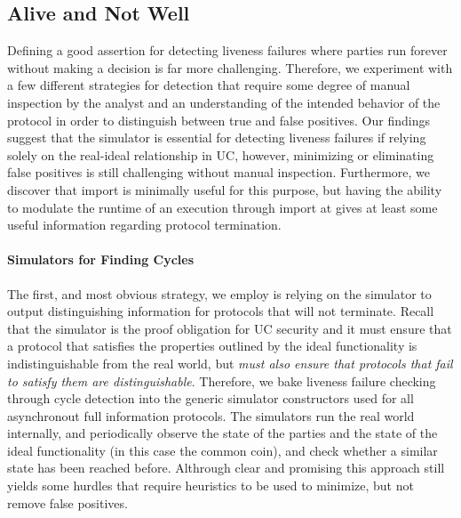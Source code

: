 \subsection{Alive and Not Well}
Defining a good assertion for detecting liveness failures where parties run
forever without making a decision is far more challenging.  Therefore, we
experiment with a few different strategies for detection that require some
degree of manual inspection by the analyst and an understanding of the intended
behavior of the protocol in order to distinguish between true and false
positives.  Our findings suggest that the simulator is essential for detecting
liveness failures if relying solely on the real-ideal relationship in UC,
however, minimizing or eliminating false positives is still challenging without
manual inspection.  Furthermore, we discover that import is minimally useful
for this purpose, but having the ability to modulate the runtime of an
execution through import at gives at least some useful information regarding
protocol termination.


\paragraph{Simulators for Finding Cycles}
The first, and most obvious strategy, we employ is relying on the simulator to
output distinguishing information for protocols that will not terminate.
Recall that the simulator is the proof obligation for UC security and it must
ensure that a protocol that satisfies the properties outlined by the ideal
functionality is indistinguishable from the real world, but \emph{must also
ensure that protocols that fail to satisfy them are distinguishable}.
Therefore, we bake liveness failure checking through cycle detection into the
generic simulator constructors used for all asynchronout full information
protocols.  The simulators run the real world internally, and periodically
observe the state of the parties and the state of the ideal functionality (in
this case the common coin), and check whether a similar state has been reached
before.  Althrough clear and promising this approach still yields some hurdles
that require heuristics to be used to minimize, but not remove false positives.

